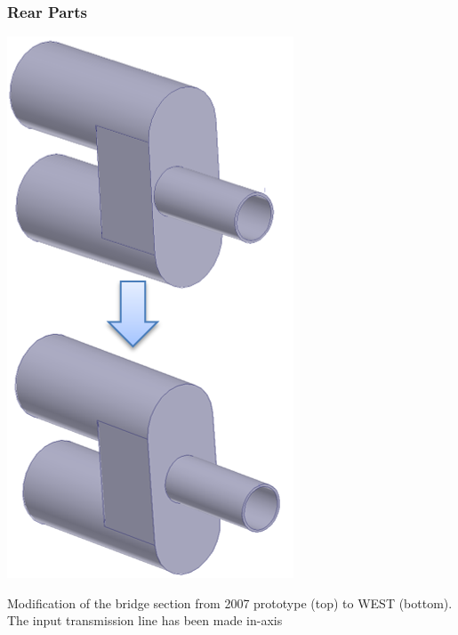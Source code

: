 {\subsubsection{Rear Parts}
\begin{marginfigure}
	\centering
	\includegraphics[width=0.9\linewidth]{figures/chap3/WEST_ICRH/bridge_evolution}
	\caption{Modification of the bridge section from 2007 prototype (top) to WEST (bottom). The input transmission line has been made in-axis}
	\label{fig:bridgeevolution}
\end{marginfigure}

}
